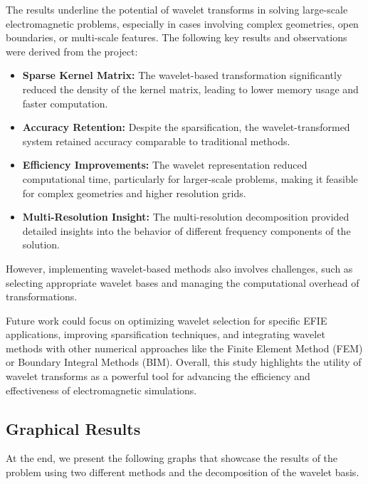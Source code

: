 \documentclass[12pt]{article}
\begin{document}
The results underline the potential of wavelet transforms in solving large-scale electromagnetic problems, especially in cases involving complex geometries, open boundaries, or multi-scale features. The following key results and observations were derived from the project\cite{Code}:

\begin{itemize}
    \item \textbf{Sparse Kernel Matrix:} The wavelet-based transformation significantly reduced the density of the kernel matrix, leading to lower memory usage and faster computation.
    \item \textbf{Accuracy Retention:} Despite the sparsification, the wavelet-transformed system retained accuracy comparable to traditional methods.
    \item \textbf{Efficiency Improvements:} The wavelet representation reduced computational time, particularly for larger-scale problems, making it feasible for complex geometries and higher resolution grids.
    \item \textbf{Multi-Resolution Insight:} The multi-resolution decomposition provided detailed insights into the behavior of different frequency components of the solution.
\end{itemize}

However, implementing wavelet-based methods also involves challenges, such as selecting appropriate wavelet bases and managing the computational overhead of transformations.

Future work could focus on optimizing wavelet selection for specific EFIE applications, improving sparsification techniques, and integrating wavelet methods with other numerical approaches like the Finite Element Method (FEM) or Boundary Integral Methods (BIM). Overall, this study highlights the utility of wavelet transforms as a powerful tool for advancing the efficiency and effectiveness of electromagnetic simulations.

\subsection{Graphical Results}
At the end, we present the following graphs that showcase the results of the problem using two different methods and the decomposition of the wavelet basis.
\end{document}
